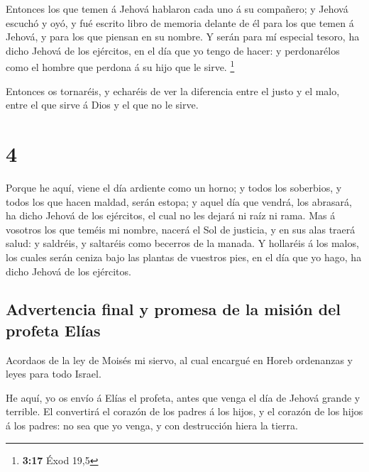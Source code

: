  Entonces los que temen á Jehová hablaron cada uno á su
compañero; y Jehová escuchó y oyó, y fué escrito libro de memoria
delante de él para los que temen á Jehová, y para los que piensan en su
nombre.  Y serán para mí especial tesoro, ha dicho Jehová
de los ejércitos, en el día que yo tengo de hacer: y perdonarélos como
el hombre que perdona á su hijo que le sirve. \footnote{\textbf{3:17}
  Éxod 19,5}

 Entonces os tornaréis, y echaréis de ver la diferencia
entre el justo y el malo, entre el que sirve á Dios y el que no le
sirve.

\hypertarget{section-3}{%
\section{4}\label{section-3}}

 Porque he aquí, viene el día ardiente como un horno; y
todos los soberbios, y todos los que hacen maldad, serán estopa; y aquel
día que vendrá, los abrasará, ha dicho Jehová de los ejércitos, el cual
no les dejará ni raíz ni rama.  Mas á vosotros los que
teméis mi nombre, nacerá el Sol de justicia, y en sus alas traerá salud:
y saldréis, y saltaréis como becerros de la manada.  Y
hollaréis á los malos, los cuales serán ceniza bajo las plantas de
vuestros pies, en el día que yo hago, ha dicho Jehová de los ejércitos.

\hypertarget{advertencia-final-y-promesa-de-la-misiuxf3n-del-profeta-eluxedas}{%
\subsection{Advertencia final y promesa de la misión del profeta
Elías}\label{advertencia-final-y-promesa-de-la-misiuxf3n-del-profeta-eluxedas}}

 Acordaos de la ley de Moisés mi siervo, al cual encargué en
Horeb ordenanzas y leyes para todo Israel.

 He aquí, yo os envío á Elías el profeta, antes que venga el
día de Jehová grande y terrible.  El convertirá el corazón
de los padres á los hijos, y el corazón de los hijos á los padres: no
sea que yo venga, y con destrucción hiera la tierra.
